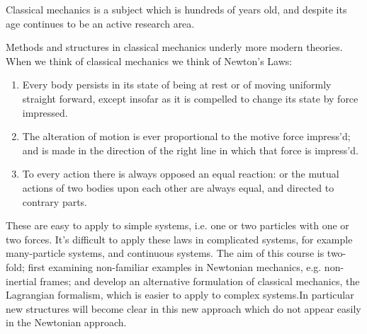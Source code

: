 Classical mechanics is a subject which is hundreds of years old, and
despite its age continues to be an active research area.

Methods and structures in classical mechanics underly more modern
theories. When we think of classical mechanics we think of Newton's
Laws:
\begin{enumerate}
\item Every body persists in its state of being at rest or of moving uniformly straight forward, except insofar as it is compelled to change its state by force impressed.
\item The alteration of motion is ever proportional to the motive force impress'd; and is made in the direction of the right line in which that force is impress'd.
\item To every action there is always opposed an equal reaction: or the mutual actions of two bodies upon each other are always equal, and directed to contrary parts.
\end{enumerate}
These are easy to apply to simple systems, i.e. one or two particles
with one or two forces. It's difficult to apply these laws in
complicated systems, for example many-particle systems, and continuous
systems. The aim of this course is two-fold; first examining
non-familiar examples in Newtonian mechanics, e.g. non-inertial
frames; and develop an alternative formulation of classical mechanics,
the Lagrangian formalism, which is easier to apply to complex
systems.In particular new structures will become clear in this new
approach which do not appear easily in the Newtonian approach.

